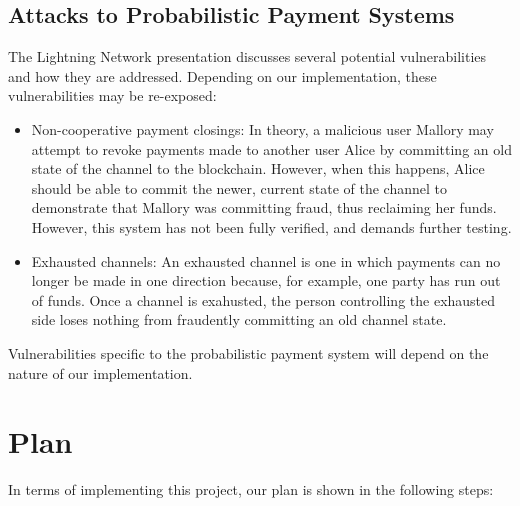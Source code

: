 \documentclass[11pt]{article}
\begin{document}
\subsection{Attacks to Probabilistic Payment Systems}
The Lightning Network presentation discusses several potential vulnerabilities and how they are addressed. Depending on our implementation, these vulnerabilities may be re-exposed:
\begin{itemize}
\item Non-cooperative payment closings: In theory, a malicious user Mallory may attempt to revoke payments made to another user Alice by committing an old state of the channel to the blockchain. However, when this happens, Alice should be able to commit the newer, current state of the channel to demonstrate that Mallory was committing fraud, thus reclaiming her funds. However, this system has not been fully verified, and demands further testing.
\item Exhausted channels: An exhausted channel is one in which payments can no longer be made in one direction because, for example, one party has run out of funds. Once a channel is exahusted, the person controlling the exhausted side loses nothing from fraudently committing an old channel state.
\end{itemize}

Vulnerabilities specific to the probabilistic payment system will depend on the nature of our implementation.

\section{Plan}

In terms of implementing this project, our plan is shown in the following steps:
\end{document}
